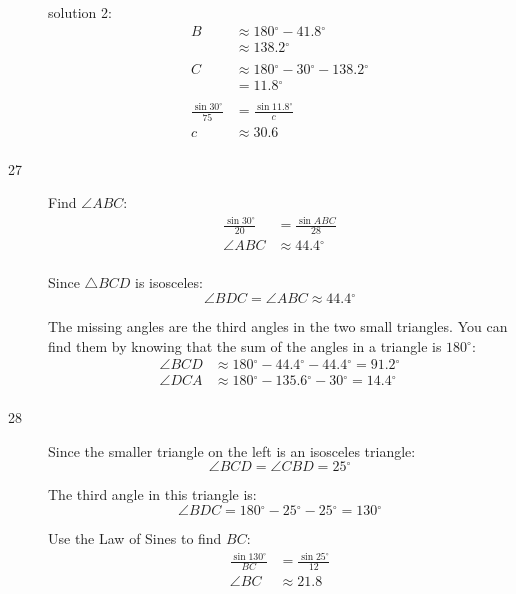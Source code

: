 \documentclass{exam}
\newcommand{\dg}{\ensuremath{^\circ}}
\begin{document}
\begin{description}
        solution 2:
        \begin{align*}
          B & \approx 180 \dg - 41.8 \dg \\
            & \approx \boxed{ 138.2 \dg } \\
          \\
          C & \approx 180 \dg - 30 \dg - 138.2 \dg \\
            & = \boxed{ 11.8 \dg } \\
          \\
          \frac{\sin 30 \dg}{75} & = \frac{\sin 11.8 \dg}{c} \\
          c                      & \approx \boxed{ 30.6 } \\
        \end{align*}

      \pagebreak

      \item[27] 
        Find $\angle ABC$:
        \begin{align*}
          \frac{\sin 30 \dg}{20} & = \frac{\sin ABC}{28} \\
          \angle ABC             & \approx 44.4 \dg \\
        \end{align*}

        Since $\triangle BCD$ is isosceles:
        \[
          \angle BDC = \angle ABC \approx 44.4 \dg
        \]

        The missing angles are the third angles in the two small triangles.  You can find them by knowing that the sum
        of the angles in a triangle is $180 \dg$:
        \begin{align*}
          \angle BCD & \approx 180 \dg - 44.4 \dg - 44.4 \dg = \boxed{ 91.2 \dg } \\
          \angle DCA & \approx 180 \dg - 135.6 \dg - 30 \dg = \boxed{ 14.4 \dg } \\
        \end{align*}

      \item[28] 
        Since the smaller triangle on the left is an isosceles triangle:
        \[
          \angle BCD = \angle CBD = 25 \dg
        \]

        The third angle in this triangle is: 
        \[
          \angle BDC = 180 \dg - 25 \dg - 25 \dg = 130 \dg
        \]

        Use the Law of Sines to find $BC$:
        \begin{align*}
          \frac{\sin 130 \dg}{BC} & = \frac{\sin 25 \dg}{12} \\
          \angle BC               & \approx 21.8 \\
        \end{align*}


\end{description}
\end{document}
